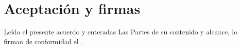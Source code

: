 
\clearpage
\section{Aceptación y firmas}

Leído el presente acuerdo y enteradas Las Partes de su contenido y alcance, lo firman de conformidad el \FechaAcuerdo.

\vspace{1cm}

\noindent
{}%
\hfill
{}
